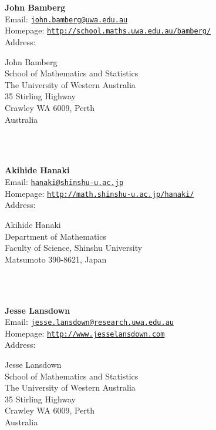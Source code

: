 \documentclass[a4paper,11pt]{report}
\begin{document}
\begin{titlepage}
\mbox{}\\
{\mbox{}\\
\small \noindent \textbf{ John Bamberg\\
    }  Email: \href{mailto://john.bamberg@uwa.edu.au} {\texttt{john.bamberg@uwa.edu.au}}\\
  Homepage: \href{http://school.maths.uwa.edu.au/~bamberg/} {\texttt{http://school.maths.uwa.edu.au/\texttt{}bamberg/}}\\
  Address: \begin{minipage}[t]{8cm}\noindent
 John Bamberg\\
 School of Mathematics and Statistics\\
 The University of Western Australia\\
 35 Stirling Highway\\
 Crawley WA 6009, Perth\\
 Australia\\
 \end{minipage}
}\\
{\mbox{}\\
\small \noindent \textbf{ Akihide Hanaki\\
    }  Email: \href{mailto://hanaki@shinshu-u.ac.jp} {\texttt{hanaki@shinshu-u.ac.jp}}\\
  Homepage: \href{http://math.shinshu-u.ac.jp/~hanaki/} {\texttt{http://math.shinshu-u.ac.jp/\texttt{}hanaki/}}\\
  Address: \begin{minipage}[t]{8cm}\noindent
 Akihide Hanaki\\
 Department of Mathematics\\
 Faculty of Science, Shinshu University\\
 Matsumoto 390-8621, Japan\\
 \end{minipage}
}\\
{\mbox{}\\
\small \noindent \textbf{ Jesse Lansdown\\
    }  Email: \href{mailto://jesse.lansdown@research.uwa.edu.au} {\texttt{jesse.lansdown@research.uwa.edu.au}}\\
  Homepage: \href{http://www.jesselansdown.com} {\texttt{http://www.jesselansdown.com}}\\
  Address: \begin{minipage}[t]{8cm}\noindent
 Jesse Lansdown\\
 School of Mathematics and Statistics\\
 The University of Western Australia\\
 35 Stirling Highway\\
 Crawley WA 6009, Perth\\
 Australia\\
 \end{minipage}
}\\
\end{titlepage}
\end{document}
